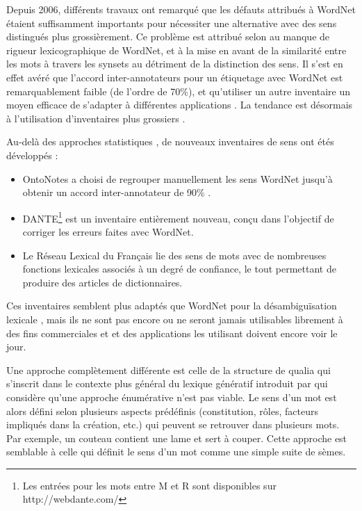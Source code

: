 Depuis 2006, différents travaux \citep{navigli2007semeval,hovy2006ontonotes}
ont remarqué que les défauts attribués à WordNet
\citep{snow2007learning,ide2007making} étaient suffisamment importants pour
nécessiter une alternative avec des sens distingués plus grossièrement. Ce
problème est attribué selon \cite{edmonds2002introduction} au manque de rigueur
lexicographique de WordNet, et à la mise en avant de la similarité entre les
mots à travers les synsets au détriment de la distinction des sens. Il s'est en
effet avéré que l'accord inter-annotateurs pour un étiquetage avec WordNet est
remarquablement faible (de l'ordre de 70\%), et qu'utiliser un autre inventaire
un moyen efficace de s'adapter à différentes applications
\citep{palmer2004different}. La tendance est désormais à l'utilisation
d'inventaires plus grossiers \citep{navigli2007semeval,navigli2012quick}.

Au-delà des approches statistiques \citep{snow2007learning}, de nouveaux
inventaires de sens ont étés développés :

\begin{itemize}

    \item OntoNotes \citep{hovy2006ontonotes} a choisi de regrouper
        manuellement les sens WordNet jusqu'à obtenir un accord
        inter-annotateur de 90\% .

    \item DANTE\footnote{Les entrées pour les mots entre M et R sont
        disponibles sur http://webdante.com/} \citep{mccarthy2010dante} est un
        inventaire entièrement nouveau, conçu dans l'objectif de corriger les
        erreurs faites avec WordNet\citep{kilgarriff2010detailed}.

    \item Le Réseau Lexical du Français\citep{gader2014lexicon} lie des sens de
        mots avec de nombreuses fonctions lexicales associés à un degré de
        confiance, le tout permettant de produire des articles de dictionnaires.

\end{itemize}

Ces inventaires semblent plus adaptés que WordNet pour la désambiguïsation
lexicale \citep{navigli2012quick}, mais ils ne sont pas encore ou ne seront
jamais utilisables librement à des fins commerciales et et des applications les
utilisant doivent encore voir le jour.

Une approche complètement différente est celle de la structure de qualia
\citep{johnston1996qualia} qui s'inscrit dans le contexte plus général du
lexique génératif introduit par \cite{pustejovsky1991generative} qui considère
qu'une approche énumérative n'est pas viable. Le sens d'un mot est alors défini
selon plusieurs aspects prédéfinis (constitution, rôles, facteurs impliqués
dans la création, etc.) qui peuvent se retrouver dans plusieurs mots. Par
exemple, un couteau contient une lame et sert à couper. Cette approche est
semblable à celle qui définit le sens d'un mot comme une simple suite de sèmes.

